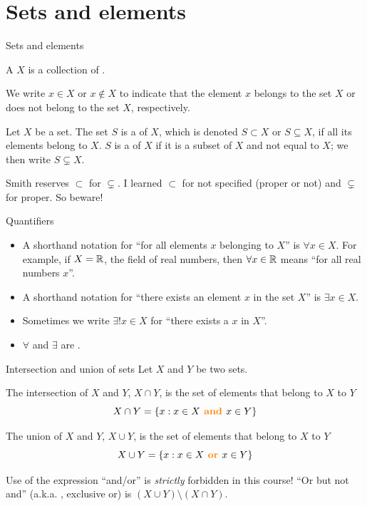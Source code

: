 \documentclass[aspectratio=169]{beamer}
\begin{document}
\section{Sets and elements}

\begin{frame}{Sets and elements}
\begin{definition}[Set]
A  $X$ is a collection of .
\end{definition}
We write $x\in X$ or $x\not\in X$ to indicate that the element $x$ belongs to the set $X$ or does not belong to the set $X$, respectively.
\begin{definition}[Subset]
Let $X$ be a set. The set $S$ is a  of $X$, which is denoted
$S\subset X$ or $S\subseteq X$, if all its elements belong to $X$. $S$ is a  of $X$ if it is a subset of $X$ and not equal to $X$; we then write $S\subsetneq X$.
\end{definition}
Smith reserves $\subset$ for $\subsetneq$. I learned $\subset$ for not specified (proper or not) and $\subsetneq$ for proper. So beware!
\end{frame}


\begin{frame}{Quantifiers}
\begin{itemize}
    \item A shorthand notation for ``for all elements $x$ belonging to $X$'' is $\forall x\in X$. For example, if $X=\mathbb{R}$, the field of real numbers, then $\forall x\in\mathbb{R}$ means ``for all real numbers $x$''.
    \item A shorthand notation for ``there exists an element $x$ in the set $X$'' is $\exists x\in X$. 
    \item Sometimes we write $\exists!x\in X$ for ``there exists a  $x$ in $X$''.
    \item $\forall$ and $\exists$ are .
\end{itemize}
\end{frame}

\begin{frame}{Intersection and union of sets}
Let $X$ and $Y$ be two sets.
\begin{definition}[Intersection]
The intersection of $X$ and $Y$, $X\cap Y$, is the set of elements that belong to $X$  to $Y$
\[
X\cap Y=\{x:x\in X{\color{orange}\textbf{ and }} x\in Y\}
\]
\end{definition}
\begin{definition}[Union]
The union of $X$ and $Y$, $X\cup Y$, is the set of elements that belong to $X$  to $Y$
\[
X\cup Y=\{x:x\in X{\color{orange}\textbf{ or }} x\in Y\}
\]
\end{definition}
Use of the expression ``and/or'' is \emph{strictly} forbidden in this course! ``Or but not and'' (a.k.a. , exclusive or) is $(X\cup Y)\setminus(X\cap Y)$.
\end{frame}
\end{document}
